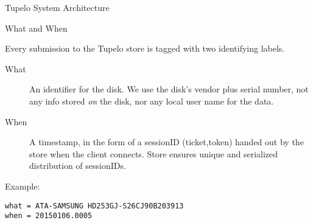\documentclass{beamer}
\begin{document}
\begin{frame}{Tupelo System Architecture}

\begin{center}
\end{center}

\end{frame}


\begin{frame}[fragile]{What and When}

Every submission to the Tupelo store is tagged with two
identifying labels.

\begin{description}
\item[What]  An identifier for the disk.  We use the disk's vendor
  plus serial number, not any info stored {\em on} the disk, nor any
  local user name for the data.  

\item[When] A timestamp, in the form of a sessionID (ticket,token)
  handed out by the store when the client connects.  Store ensures
  unique and serialized distribution of sessionIDs.
\end{description}

Example:
\begin{verbatim}
what = ATA-SAMSUNG HD253GJ-S26CJ90B203913
when = 20150106.0005
\end{verbatim}

\end{frame}
\end{document}
